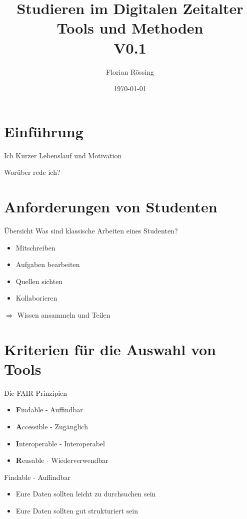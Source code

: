 \documentclass{beamer}
\title{Studieren im Digitalen Zeitalter \\\small Tools und Methoden\\ V0.1}
\author{Florian Rössing}
\date{\today}
\begin{document}
\maketitle

\section{Einführung}
\begin{frame}{Ich}
    Kurzer Lebenslauf und Motivation
\end{frame}
\begin{frame}{Worüber rede ich?}
    \tableofcontents
\end{frame}

\section{Anforderungen von Studenten}
\begin{frame}{Übersicht}
Was sind klassische Arbeiten eines Studenten?
    \begin{itemize}
        \item Mitschreiben
        \item Aufgaben bearbeiten
        \item Quellen sichten
        \item Kollaborieren
    \end{itemize}
    $\Rightarrow$ Wissen ansammeln und Teilen
\end{frame}
\section{Kriterien für die Auswahl von Tools}
\begin{frame}{Die FAIR Prinzipien}
    \begin{itemize}[]
        \item[] \textbf{F}indable - Auffindbar
        \item[] \textbf{A}ccessible - Zugänglich
        \item[] \textbf{I}nteroperable - Interoperabel
        \item[] \textbf{R}eusable - Wiederverwendbar
    \end{itemize}
\end{frame}

\begin{frame}{Findable - Auffindbar}
    \begin{itemize}
        \item Eure Daten sollten leicht zu durchsuchen sein
        \item Eure Daten sollten gut strukturiert sein
    \end{itemize}
\end{frame}
\end{document}

